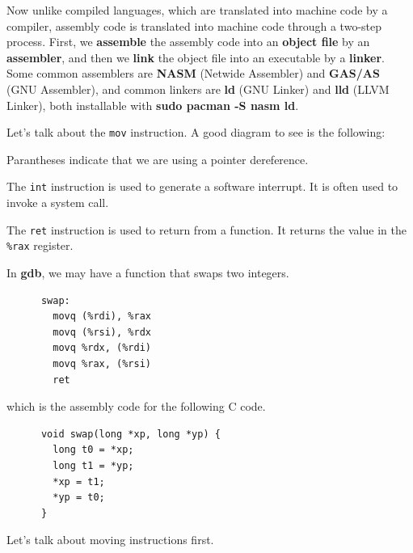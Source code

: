   Now unlike compiled languages, which are translated into machine code by a compiler, assembly code is translated into machine code through a two-step process. First, we \textbf{assemble} the assembly code into an \textbf{object file} by an \textbf{assembler}, and then we \textbf{link} the object file into an executable by a \textbf{linker}. Some common assemblers are \textbf{NASM} (Netwide Assembler) and \textbf{GAS/AS} (GNU Assembler), and common linkers are \textbf{ld} (GNU Linker) and \textbf{lld} (LLVM Linker), both installable with \textbf{sudo pacman -S nasm ld}. 

  \begin{definition}[mov]
    \label{def:mov}
    Let's talk about the \texttt{mov} instruction. A good diagram to see is the following: 
    \begin{center}  
    \end{center} 
    Parantheses indicate that we are using a pointer dereference. 
  \end{definition}

  \begin{definition}[int]
    \label{def:int}
    The \texttt{int} instruction is used to generate a software interrupt. It is often used to invoke a system call.
  \end{definition}

  \begin{definition}[ret]
    \label{def:ret}
    The \texttt{ret} instruction is used to return from a function. It returns the value in the \texttt{\%rax} register. 
  \end{definition}

  \begin{example}
    \label{ex:swap-function}
    In \textbf{gdb}, we may have a function that swaps two integers. 
    \begin{lstlisting} 
      swap:
        movq (%rdi), %rax
        movq (%rsi), %rdx
        movq %rdx, (%rdi)
        movq %rax, (%rsi)
        ret
    \end{lstlisting}
    which is the assembly code for the following C code.
    \begin{lstlisting} 
      void swap(long *xp, long *yp) {
        long t0 = *xp;
        long t1 = *yp;
        *xp = t1;
        *yp = t0;
      }
    \end{lstlisting}
  \end{example}

  Let's talk about moving instructions first. 


